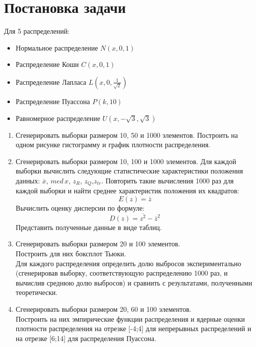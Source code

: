 

\section{Постановка задачи}

Для 5 распределений: 

\begin{itemize}
	\item Нормальное распределение $N(x,0,1)$
	\item Распределение Коши $C(x,0,1)$
	\item Распределение Лапласа $L(x,0,\frac{1}{\sqrt{2}})$
	\item Распределение Пуассона $P(k,10)$
	\item Равномерное распределение $U(x,-\sqrt{3},\sqrt{3})$
\end{itemize}

\begin{enumerate}
	\item Сгенерировать выборки размером 10, 50 и 1000 элементов. Построить на одном рисунке гистограмму и график плотности распределения.
	
	\item Сгенерировать выборки размером 10, 100 и 1000 элементов. Для каждой выборки вычислить следующие статистические характеристики положения данных: $\overline{x}$, $med \, x$, $z_{R}$, $z_{Q}$,$z_{tr}$. Повторить такие вычисления 1000 раз для каждой выборки и найти среднее характеристик положения их квадратов: 
	\begin{equation}
		E(z)=\overline{z}
	\end{equation}
    Вычислить оценку дисперсии по формуле: 
    \begin{equation}
    	D(z)=\overline{z^{2}}-\overline{z}^{2}
    \end{equation}
    Представить полученные данные в виде таблиц.
    
    \item Сгенерировать выборки размером 20 и 100 элементов. \\
    Построить для них боксплот Тьюки. \\
    Для каждого распределения определить долю выбросов экспериментально (сгенерировав выборку, соответствующую распределению 1000 раз, и вычислив среднюю долю выбросов) и сравнить с результатами, полученными теоретически. 
    
    \item Сгенерировать выборки размером 20, 60 и 100 элементов. \\
    Построить на них эмпирические функции распределения и ядерные оценки плотности распределения на отрезке [-4;4] для непрерывных распределений и на отрезке [6;14] для распределения Пуассона.
    
\end{enumerate}
